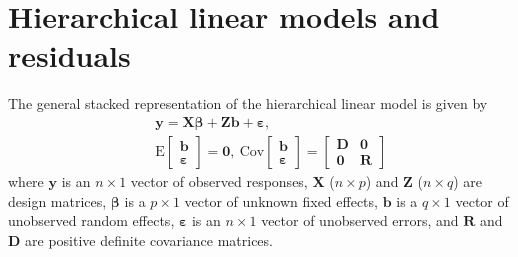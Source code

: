 \documentclass{article} %
\newcommand{\E}{\ensuremath{\mathrm{E}}}
\newcommand{\cov}{\ensuremath{\mathrm{Cov}}}
\begin{document}
\section{Hierarchical linear models and residuals}\label{sec:resid}
The general stacked representation of the hierarchical linear model is given by
%
\begin{eqnarray}\label{eq:hlm}
 && \bm{y} = \bm{X \beta} + \bm{Z b} + \bm{\varepsilon}, \\ \nonumber
 && \E \begin{bmatrix} \bm{b} \\ \bm{\varepsilon} \end{bmatrix} = \bm{0}, 
 \ \cov \begin{bmatrix} \bm{b} \\ \bm{\varepsilon} \end{bmatrix} = 
  	\begin{bmatrix} \bm{D} & \bm{0}\\ \bm{0} & \bm{R} \end{bmatrix}
\end{eqnarray}
%
where $\bm{y}$ is an $n \times 1$ vector of observed responses, $\bm{X}$ ($n \times p$) and $\bm{Z}$ ($n \times q$) are design matrices, $\bm{\beta}$ is a $p \times 1$ vector of unknown fixed effects, $\bm{b}$ is a $q \times 1$ vector of unobserved random effects, $\bm{\varepsilon}$ is an $n \times 1$ vector of unobserved errors, and $\bm{R}$ and $\bm{D}$ are positive definite covariance matrices.
\end{document}
